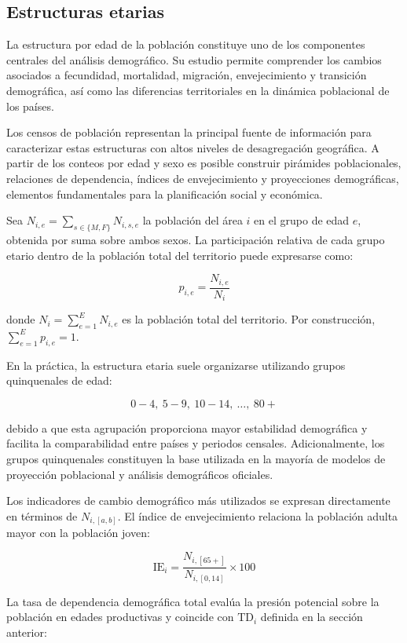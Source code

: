 \documentclass[
  spanish,
]{book}
\begin{document}
\subsection{Estructuras etarias}\label{estructuras-etarias}

La estructura por edad de la población constituye uno de los componentes centrales del análisis demográfico. Su estudio permite comprender los cambios asociados a fecundidad, mortalidad, migración, envejecimiento y transición demográfica, así como las diferencias territoriales en la dinámica poblacional de los países.

Los censos de población representan la principal fuente de información para caracterizar estas estructuras con altos niveles de desagregación geográfica. A partir de los conteos por edad y sexo es posible construir pirámides poblacionales, relaciones de dependencia, índices de envejecimiento y proyecciones demográficas, elementos fundamentales para la planificación social y económica.

Sea \(N_{i,e} = \sum_{s \in \{M,F\}} N_{i,s,e}\) la población del área \(i\) en el grupo de edad \(e\), obtenida por suma sobre ambos sexos. La participación relativa de cada grupo etario dentro de la población total del territorio puede expresarse como:

\[
p_{i,e} = \frac{N_{i,e}}{N_i}
\]

donde \(N_i = \sum_{e=1}^{E} N_{i,e}\) es la población total del territorio. Por construcción, \(\sum_{e=1}^{E} p_{i,e} = 1\).

En la práctica, la estructura etaria suele organizarse utilizando grupos quinquenales de edad:

\[
0-4,\ 5-9,\ 10-14,\ \ldots,\ 80+
\]

debido a que esta agrupación proporciona mayor estabilidad demográfica y facilita la comparabilidad entre países y periodos censales. Adicionalmente, los grupos quinquenales constituyen la base utilizada en la mayoría de modelos de proyección poblacional y análisis demográficos oficiales.

Los indicadores de cambio demográfico más utilizados se expresan directamente en términos de \(N_{i,[a,b]}\). El índice de envejecimiento relaciona la población adulta mayor con la población joven:

\[
\text{IE}_i = \frac{N_{i,[65+]}}{N_{i,[0,14]}} \times 100
\]

La tasa de dependencia demográfica total evalúa la presión potencial sobre la población en edades productivas y coincide con \(\text{TD}_i\) definida en la sección anterior:
\end{document}
